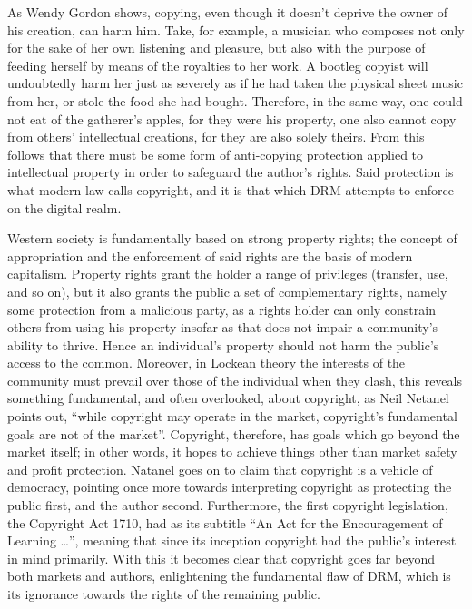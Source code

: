 \documentclass[12pt,letterpaper]{article}
\begin{document}
As Wendy Gordon shows, copying, even though it doesn't deprive the owner of his creation, can harm him. Take, for example, a musician who composes not only for the sake of her own listening and pleasure, but also with the purpose of feeding herself by means of the royalties to her work. A bootleg copyist will undoubtedly harm her just as severely as if he had taken the physical sheet music from her, or stole the food she had bought\autocite[\ppno~1548]{gordon-1993}. Therefore, in the same way, one could not eat of the gatherer's apples, for they were his property, one also cannot copy from others' intellectual creations, for they are also solely theirs. From this follows that there must be some form of anti-copying protection applied to intellectual property in order to safeguard the author's rights. Said protection is what modern law calls copyright, and it is that which DRM attempts to enforce on the digital realm.

Western society is fundamentally based on strong property rights; the concept of appropriation and the enforcement of said rights are the basis of modern capitalism. Property rights grant the holder a range of privileges (transfer, use, and so on), but it also grants the public a set of complementary rights, namely some protection from a malicious party, as a rights holder can only constrain others from using his property insofar as that does not impair a community's ability to thrive\autocite[\ppno~1555--1560]{gordon-1993}. Hence an individual's property should not harm the public's access to the common. Moreover, in Lockean theory the interests of the community must prevail over those of the individual when they clash\autocite[\ppno~120]{favale-2014}, this reveals something fundamental, and often overlooked, about copyright, as Neil Netanel points out, ``while copyright may operate in the market, copyright's fundamental goals are not of the market''\autocite[\ppno~341]{netanel-2001}. Copyright, therefore, has goals which go beyond the market itself; in other words, it hopes to achieve things other than market safety and profit protection. Natanel goes on to claim that copyright is a vehicle of democracy, pointing once more towards interpreting copyright as protecting the public first, and the author second. Furthermore, the first copyright legislation, the Copyright Act 1710, had as its subtitle ``An Act for the Encouragement of Learning \ldots''\autocite{wortley-1710}, meaning that since its inception copyright had the public's interest in mind primarily. With this it becomes clear that copyright goes far beyond both markets and authors, enlightening the fundamental flaw of DRM, which is its ignorance towards the rights of the remaining public.
\end{document}
